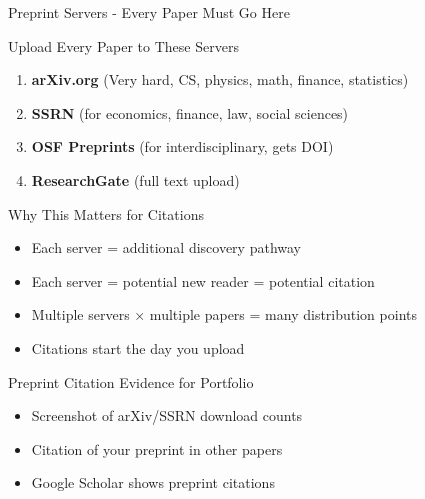 \documentclass[11pt]{beamer}
\begin{document}
	\begin{frame}{Preprint Servers - Every Paper Must Go Here}
		\scriptsize
		\begin{block}{Upload Every Paper to These Servers}
			\begin{enumerate}
				\item \textbf{arXiv.org} (Very hard, CS, physics, math, finance, statistics)
				\item \textbf{SSRN} (for economics, finance, law, social sciences)
				\item \textbf{OSF Preprints} (for interdisciplinary, gets DOI)
				\item \textbf{ResearchGate} (full text upload)
			\end{enumerate}
		\end{block}
		\begin{block}{Why This Matters for Citations}
			\begin{itemize}
				\item Each server = additional discovery pathway
				\item Each server = potential new reader = potential citation
				\item Multiple servers × multiple papers = many distribution points
				\item Citations start the day you upload
			\end{itemize}
		\end{block}
		\begin{block}{Preprint Citation Evidence for Portfolio}
			\begin{itemize}
				\item Screenshot of arXiv/SSRN download counts
				\item Citation of your preprint in other papers
				\item Google Scholar shows preprint citations
			\end{itemize}
		\end{block}
	\end{frame}
	
\end{document}
